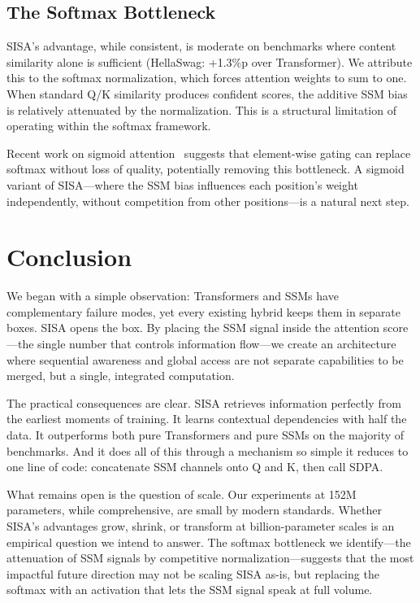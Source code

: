 \documentclass[11pt]{article}
\begin{document}
\subsection{The Softmax Bottleneck}

SISA's advantage, while consistent, is moderate on benchmarks where content similarity alone is sufficient (HellaSwag: +1.3\%p over Transformer). We attribute this to the softmax normalization, which forces attention weights to sum to one. When standard Q/K similarity produces confident scores, the additive SSM bias is relatively attenuated by the normalization. This is a structural limitation of operating within the softmax framework.

Recent work on sigmoid attention~\citep{sigmoid_attn} suggests that element-wise gating can replace softmax without loss of quality, potentially removing this bottleneck. A sigmoid variant of SISA---where the SSM bias influences each position's weight independently, without competition from other positions---is a natural next step.

\section{Conclusion}

We began with a simple observation: Transformers and SSMs have complementary failure modes, yet every existing hybrid keeps them in separate boxes. SISA opens the box. By placing the SSM signal inside the attention score---the single number that controls information flow---we create an architecture where sequential awareness and global access are not separate capabilities to be merged, but a single, integrated computation.

The practical consequences are clear. SISA retrieves information perfectly from the earliest moments of training. It learns contextual dependencies with half the data. It outperforms both pure Transformers and pure SSMs on the majority of benchmarks. And it does all of this through a mechanism so simple it reduces to one line of code: concatenate SSM channels onto Q and K, then call SDPA.

What remains open is the question of scale. Our experiments at 152M parameters, while comprehensive, are small by modern standards. Whether SISA's advantages grow, shrink, or transform at billion-parameter scales is an empirical question we intend to answer. The softmax bottleneck we identify---the attenuation of SSM signals by competitive normalization---suggests that the most impactful future direction may not be scaling SISA as-is, but replacing the softmax with an activation that lets the SSM signal speak at full volume.
\end{document}
